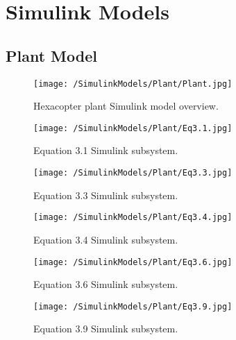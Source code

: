
\renewcommand*{\thepage}{A-\arabic{page}}

\chapter{Simulink Models}\label{appendix:Simulink}

\section{Plant Model}\label{section:Simu_Plant}
\begin{figure}[htb]
\begin{center}
	\texttt{[image: /SimulinkModels/Plant/Plant.jpg]}%
	\end{center}
	\caption{Hexacopter plant Simulink model overview.}%
\end{figure}

\begin{figure}[htb]
\begin{center}
	\texttt{[image: /SimulinkModels/Plant/Eq3.1.jpg]}%
	\end{center}
	\caption{Equation 3.1 Simulink subsystem.}%
\end{figure}

\begin{figure}[htb]
\begin{center}
	\texttt{[image: /SimulinkModels/Plant/Eq3.3.jpg]}%
	\end{center}
	\caption{Equation 3.3 Simulink subsystem.}%
\end{figure}

\begin{figure}[htb]
\begin{center}
	\texttt{[image: /SimulinkModels/Plant/Eq3.4.jpg]}%
	\end{center}
	\caption{Equation 3.4 Simulink subsystem.}%
\end{figure}

\begin{figure}[htb]
\begin{center}
	\texttt{[image: /SimulinkModels/Plant/Eq3.6.jpg]}%
	\end{center}
	\caption{Equation 3.6 Simulink subsystem.}%
\end{figure}

\begin{figure}[htb]
\begin{center}
	\texttt{[image: /SimulinkModels/Plant/Eq3.9.jpg]}%
	\end{center}
	\caption{Equation 3.9 Simulink subsystem.}%
\end{figure}



